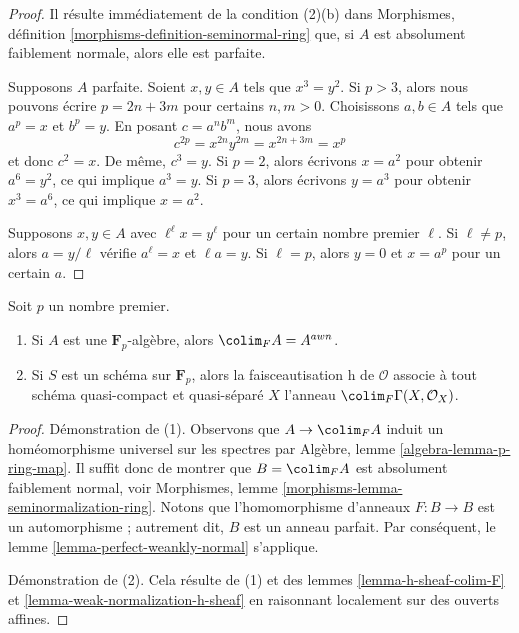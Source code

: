 \begin{proof}
Il résulte immédiatement de la condition (2)(b) dans
Morphismes, définition \ref{morphisms-definition-seminormal-ring}
que, si $A$ est absolument faiblement normale, alors elle est parfaite.

\medskip\noindent
Supposons $A$ parfaite. Soient $x, y \in A$ tels que $x^3 = y^2$.
Si $p > 3$, alors nous pouvons écrire $p = 2n + 3m$ pour certains $n, m > 0$.
Choisissons $a, b \in A$ tels que $a^p = x$ et $b^p = y$.
En posant $c = a^n b^m$, nous avons
$$
c^{2p} = x^{2n} y^{2m} = x^{2n + 3m} = x^p
$$
et donc $c^2 = x$. De même, $c^3 = y$. Si $p = 2$, alors
écrivons $x = a^2$ pour obtenir $a^6 = y^2$, ce qui implique $a^3 = y$.
Si $p = 3$, alors écrivons $y = a^3$ pour obtenir $x^3 = a^6$, ce qui
implique $x = a^2$.

\medskip\noindent
Supposons $x, y \in A$ avec $\ell^\ell x = y^\ell$ pour un certain nombre
premier $\ell$. Si $\ell \not = p$, alors $a = y/\ell$ vérifie
$a^\ell = x$ et $\ell a = y$. Si $\ell = p$, alors
$y = 0$ et $x = a^p$ pour un certain $a$.
\end{proof}

\begin{lemma}
\label{lemma-char-p}
Soit $p$ un nombre premier.
\begin{enumerate}
\item Si $A$ est une $\mathbf{F}_p$-algèbre, alors $\colim_F A = A^{awn}$.
\item Si $S$ est un schéma sur $\mathbf{F}_p$, alors la
faisceautisation h de $\mathcal{O}$ associe à tout schéma quasi-compact
et quasi-séparé $X$ l'anneau $\colim_F \Gamma(X, \mathcal{O}_X)$.
\end{enumerate}
\end{lemma}

\begin{proof}
Démonstration de (1). Observons que $A \to \colim_F A$ induit un
homéomorphisme universel sur les spectres par
Algèbre, lemme \ref{algebra-lemma-p-ring-map}.
Il suffit donc de montrer que $B = \colim_F A$ est
absolument faiblement normal, voir
Morphismes, lemme \ref{morphisms-lemma-seminormalization-ring}.
Notons que l'homomorphisme d'anneaux $F : B \to B$ est un automorphisme ;
autrement dit, $B$ est un anneau parfait. Par conséquent, le
lemme \ref{lemma-perfect-weankly-normal} s'applique.

\medskip\noindent
Démonstration de (2). Cela résulte de (1) et des
lemmes \ref{lemma-h-sheaf-colim-F} et
\ref{lemma-weak-normalization-h-sheaf}
en raisonnant localement sur des ouverts affines.
\end{proof}






